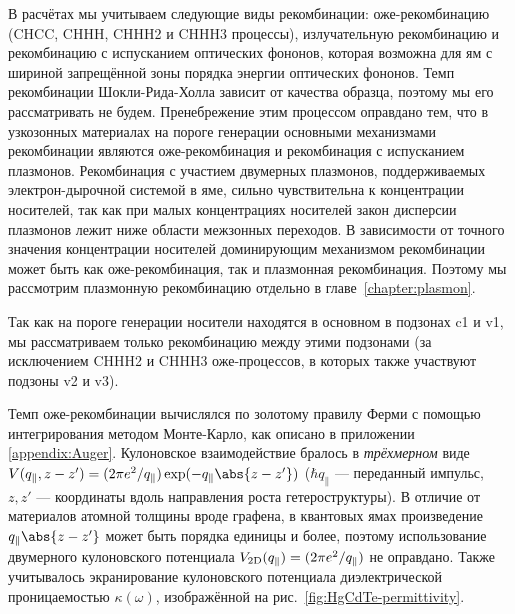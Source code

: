 В расчётах мы учитываем следующие виды рекомбинации: оже-рекомбинацию (CHCC, CHHH, CHHH2 и CHHH3 процессы), излучательную рекомбинацию и рекомбинацию с испусканием оптических фононов, которая возможна для ям с шириной запрещённой зоны порядка энергии оптических фононов. Темп рекомбинации Шокли-Рида-Холла зависит от качества образца, поэтому мы его рассматривать не будем. Пренебрежение этим процессом оправдано тем, что в узкозонных материалах на пороге генерации основными механизмами рекомбинации являются оже-рекомбинация и рекомбинация с испусканием плазмонов. Рекомбинация с участием двумерных плазмонов, поддерживаемых электрон-дырочной системой в яме, сильно чувствительна к концентрации носителей, так как при малых концентрациях носителей закон дисперсии плазмонов лежит ниже области межзонных переходов. В зависимости от точного значения концентрации носителей доминирующим механизмом рекомбинации может быть как оже-рекомбинация, так и плазмонная рекомбинация. Поэтому мы рассмотрим плазмонную рекомбинацию отдельно в главе~\ref{chapter:plasmon}.

Так как на пороге генерации носители находятся в основном в подзонах c1 и v1, мы рассматриваем только рекомбинацию между этими подзонами (за исключением CHHH2 и CHHH3 оже-процессов, в которых также участвуют подзоны v2 и v3).

Темп оже-рекомбинации вычислялся по золотому правилу Ферми с помощью интегрирования методом Монте-Карло, как описано в приложении \ref{appendix:Auger}. Кулоновское взаимодействие бралось в \emph{трёхмерном} виде $V(q_{\parallel},z-z') = (2\pi e^2 / q_{\parallel})\exp(-q_{\parallel}\abs{z-z'})$ ($\hbar q_{\parallel}$ --- переданный импульс, $z, z'$ --- координаты вдоль направления роста гетероструктуры). В отличие от материалов атомной толщины вроде графена, в квантовых ямах произведение $q_{\parallel}\abs{z-z'}$ может быть порядка единицы и более, поэтому использование двумерного кулоновского потенциала $V_{\rm 2D}(q_{\parallel}) = (2\pi e^2 / q_{\parallel})$ не оправдано. Также учитывалось экранирование кулоновского потенциала диэлектрической проницаемостью $\kappa(\omega)$, изображённой на рис.~\ref{fig:HgCdTe-permittivity}.

